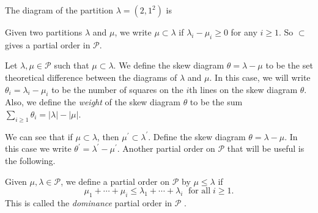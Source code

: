 \begin{dang}
    \begin{example}
        The diagram of the partition $\lambda=(2,1^2)$ is
        \begin{center}
        \end{center}
    \end{example}
\end{dang}
\begin{dang}
    \begin{definition}\cite{macdonald1998symmetric}
        Given two partitions $\lambda$ and $\mu$, we write $\mu\subset \lambda$ if $\lambda_i-\mu_i\geq0$ for any $i\geq1$. So $\subset$ gives a  partial order in $\mathcal{P}$.
    \end{definition}
\end{dang}
\begin{dang}
    \begin{definition}\cite{macdonald1998symmetric}
        Let $\lambda,\mu\in\mathcal{P}$ such that $\mu\subset\lambda$. We define the skew diagram $\theta=\lambda-\mu$ to be the set theoretical difference between the diagrams of $\lambda$ and $\mu$. In this case, we will write $\theta_i=\lambda_i-\mu_i$ to be the number of squares on the $i$th lines on the skew diagram $\theta$. Also, we define the \textit{weight} of the skew diagram $\theta$ to be the sum $\sum_{i\geq1}\theta_i=|\lambda|-|\mu|$.
    \end{definition}
\end{dang}
We can see that if $\mu\subset\lambda$, then $\mu^\prime\subset\lambda^\prime$. Define the skew diagram $\theta=\lambda-\mu$. In this case we write $\theta^\prime=\lambda^\prime-\mu^\prime$. Another partial order on $\mathcal{P}$ that will be useful is the following.
\begin{dang}
    \begin{definition}
        Given $\mu,\lambda\in\mathcal{P}$, we define a partial order on $\mathcal{P}$ by $\mu\leq\lambda$ if 
        \[
        \mu_1+\cdots+\mu_i\leq \lambda_1+\cdots+\lambda_i\;\text{ for all}\; i\geq1.
        \]
    This is called the \textit{dominance} partial order in $\mathcal{P}$ \cite{macdonald1998symmetric}.
    \end{definition}
\end{dang}
